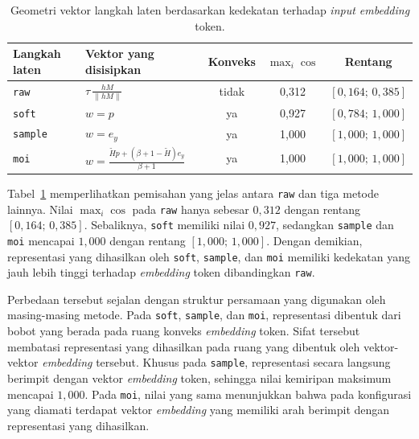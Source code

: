 \begin{table}[H]
    \centering
    \caption{Geometri vektor langkah laten berdasarkan kedekatan terhadap
    \textit{input embedding} token.}
    \label{tab:geometri-vektor}
    \small
    \begin{tabular}{l l c c c}
        \hline
        Langkah laten & Vektor yang disisipkan & Konveks &
        $\max_i\cos$ & Rentang \\
        \hline
        \texttt{raw}
        & $\displaystyle \tau\,\frac{hM}{\lVert hM\rVert}$
        & tidak & 0,312 & $[0,164;\,0,385]$ \\

        \texttt{soft}
        & $w=p$
        & ya & 0,927 & $[0,784;\,1,000]$ \\

        \texttt{sample}
        & $w=e_y$
        & ya & 1,000 & $[1,000;\,1,000]$ \\

        \texttt{moi}
        & $\displaystyle
        w=
        \frac{\tilde{H}p+(\beta+1-\tilde{H})e_y}
        {\beta+1}$
        & ya & 1,000 & $[1,000;\,1,000]$ \\
        \hline
    \end{tabular}
\end{table}

Tabel~\ref{tab:geometri-vektor} memperlihatkan pemisahan yang jelas antara
\texttt{raw} dan tiga metode lainnya. Nilai $\max_i\cos$ pada \texttt{raw}
hanya sebesar $0{,}312$ dengan rentang $[0{,}164;\,0{,}385]$. Sebaliknya,
\texttt{soft} memiliki nilai $0{,}927$, sedangkan \texttt{sample} dan
\texttt{moi} mencapai $1{,}000$ dengan rentang $[1{,}000;\,1{,}000]$.
Dengan demikian, representasi yang dihasilkan oleh \texttt{soft},
\texttt{sample}, dan \texttt{moi} memiliki kedekatan yang jauh lebih tinggi
terhadap \textit{embedding} token dibandingkan \texttt{raw}.

Perbedaan tersebut sejalan dengan struktur persamaan yang digunakan oleh
masing-masing metode. Pada \texttt{soft}, \texttt{sample}, dan \texttt{moi},
representasi dibentuk dari bobot yang berada pada ruang konveks
\textit{embedding} token. Sifat tersebut membatasi representasi yang dihasilkan
pada ruang yang dibentuk oleh vektor-vektor \textit{embedding} tersebut.
Khusus pada \texttt{sample}, representasi secara langsung berimpit dengan
vektor \textit{embedding} token, sehingga nilai kemiripan maksimum mencapai
$1{,}000$. Pada \texttt{moi}, nilai yang sama menunjukkan bahwa pada konfigurasi
yang diamati terdapat vektor \textit{embedding} yang memiliki arah berimpit
dengan representasi yang dihasilkan.

